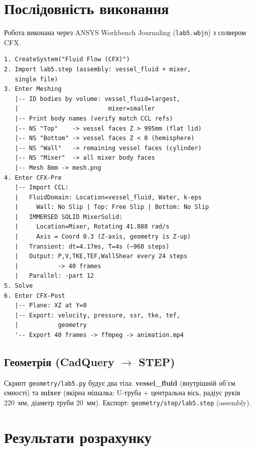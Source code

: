 \section{Послідовність виконання}

Робота виконана через ANSYS Workbench Journaling (\texttt{lab5.wbjn}) з солвером CFX.

\begin{lstlisting}[style=scheme]
1. CreateSystem("Fluid Flow (CFX)")
2. Import lab5.step (assembly: vessel_fluid + mixer,
   single file)
3. Enter Meshing
   |-- ID bodies by volume: vessel_fluid=largest,
   |                         mixer=smaller
   |-- Print body names (verify match CCL refs)
   |-- NS "Top"    -> vessel faces Z > 995mm (flat lid)
   |-- NS "Bottom" -> vessel faces Z < 0 (hemisphere)
   |-- NS "Wall"   -> remaining vessel faces (cylinder)
   |-- NS "Mixer"  -> all mixer body faces
   |-- Mesh 8mm -> mesh.png
4. Enter CFX-Pre
   |-- Import CCL:
   |   FluidDomain: Location=vessel_fluid, Water, k-eps
   |     Wall: No Slip | Top: Free Slip | Bottom: No Slip
   |   IMMERSED SOLID MixerSolid:
   |     Location=Mixer, Rotating 41.888 rad/s
   |     Axis = Coord 0.3 (Z-axis, geometry is Z-up)
   |   Transient: dt=4.17ms, T=4s (~960 steps)
   |   Output: P,V,TKE,TEF,WallShear every 24 steps
   |           -> 40 frames
   |   Parallel: -part 12
5. Solve
6. Enter CFX-Post
   |-- Plane: XZ at Y=0
   |-- Export: velocity, pressure, ssr, tke, tef,
   |           geometry
   '-- Export 40 frames -> ffmpeg -> animation.mp4
\end{lstlisting}

\subsection{Геометрія (CadQuery $\to$ STEP)}

Скрипт \texttt{geometry/lab5.py} будує два тіла: \textbf{vessel\_fluid} (внутрішній об'єм ємності) та \textbf{mixer} (якірна мішалка: U-труба + центральна вісь, радіус руків 220~мм, діаметр труби 20~мм). Експорт: \texttt{geometry/step/lab5.step} (assembly).



\section{Результати розрахунку}

